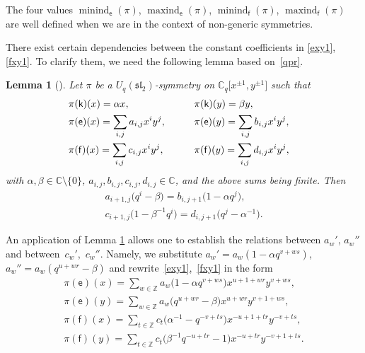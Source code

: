 \documentclass[10pt,a4paper]{amsart}
\numberwithin{equation}{section}
\newtheorem{Lemma}[Theorem]{Lemma}
\begin{document}
The four values $\operatorname{minind}_\mathsf{e}(\pi)$, $\operatorname{maxind}_\mathsf{e}(\pi)$, $\operatorname{minind}_\mathsf{f}(\pi)$, $\operatorname{maxind}_\mathsf{f}(\pi)$ are well defined when we are in the context of non-generic symmetries.

There exist certain dependencies between the constant coefficients in \eqref{exy1}, \eqref{fxy1}. To clarify them, we need the following lemma based on~\eqref{qpr}.

\begin{Lemma}[{\cite[Lemma 4.2]{S}}]\label{ratios} Let $\pi$ be a $U_q(\mathfrak{sl}_2)$-symmetry on $\mathbb{C}_q\big[x^{\pm 1},y^{\pm 1}\big]$ such that
\begin{alignat}{3}
&\pi(\mathsf{k})(x)=\alpha x,\qquad && \pi(\mathsf{k})(y) =\beta y, &\notag\\
& \pi(\mathsf{e})(x) =\sum_{i,j}a_{i,j}x^iy^j, \qquad && \pi(\mathsf{e})(y) =\sum_{i,j}b_{i,j}x^iy^j, &\label{ex_y}\\
& \pi(\mathsf{f})(x) =\sum_{i,j}c_{i,j}x^iy^j,\qquad && \pi(\mathsf{f})(y) =\sum_{i,j}d_{i,j}x^iy^j, &\label{fx_y}
\end{alignat}
with $\alpha,\beta\in\mathbb{C}{\setminus}\{0\}$, $a_{i,j},b_{i,j},c_{i,j},d_{i,j}\in\mathbb{C}$, and the above sums being finite. Then
\begin{gather*}
a_{i+1,j}\big(q^i-\beta\big) =b_{i,j+1}\big(1-\alpha q^j\big),\\
 c_{i+1,j}\big(1-\beta^{-1}q^i\big) =d_{i,j+1}\big(q^j-\alpha^{-1}\big).
\end{gather*}
\end{Lemma}

An application of Lemma \ref{ratios} allows one to establish the relations between $a_w'$, $a_w''$ and between~$c_w'$,~$c_w''$. Namely, we substitute $a_w'=a_w(1-\alpha q^{v+ws})$, $a_w''=a_w(q^{u+wr}-\beta)$ and rewrite~\eqref{exy1},~\eqref{fxy1} in the form
\begin{gather}
\pi(\mathsf{e})(x) =\sum_{w\in\mathbb{Z}}a_w\big(1-\alpha q^{v+ws}\big)x^{u+1+wr}y^{v+ws},\label{ex2}\\
\pi(\mathsf{e})(y) =\sum_{w\in\mathbb{Z}}a_w\big(q^{u+wr}-\beta\big)x^{u+wr}y^{v+1+ws}, \label{ey2}\\
\pi(\mathsf{f})(x) =\sum_{t\in\mathbb{Z}}c_t\big(\alpha^{-1}-q^{-v+ts}\big)x^{-u+1+tr}y^{-v+ts}, \label{fx2}\\
\pi(\mathsf{f})(y) =\sum_{t\in\mathbb{Z}}c_t\big(\beta^{-1}q^{-u+tr}-1\big)x^{-u+tr}y^{-v+1+ts}. \label{fy2}
\end{gather}
\end{document}
